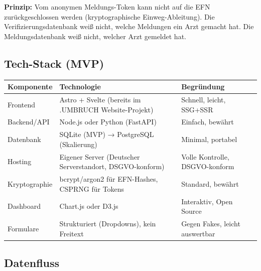 \documentclass{umbruch-position}
\begin{document}
\textbf{Prinzip:} Vom anonymen Meldungs-Token kann nicht auf die EFN zurückgeschlossen werden (kryptographische Einweg-Ableitung). Die Verifizierungsdatenbank weiß nicht, welche Meldungen ein Arzt gemacht hat. Die Meldungsdatenbank weiß nicht, welcher Arzt gemeldet hat.

\subsection{Tech-Stack (MVP)}

{\small
\begin{tabularx}{\textwidth}{X X X}
\toprule
\textbf{Komponente} & \textbf{Technologie} & \textbf{Begründung} \\
\midrule
Frontend & Astro + Svelte (bereits im .UMBRUCH Website-Projekt) & Schnell, leicht, SSG+SSR \\
Backend/API & Node.js oder Python (FastAPI) & Einfach, bewährt \\
Datenbank & SQLite (MVP) → PostgreSQL (Skalierung) & Minimal, portabel \\
Hosting & Eigener Server (Deutscher Serverstandort, DSGVO-konform) & Volle Kontrolle, DSGVO-konform \\
Kryptographie & bcrypt/argon2 für EFN-Hashes, CSPRNG für Tokens & Standard, bewährt \\
Dashboard & Chart.js oder D3.js & Interaktiv, Open Source \\
Formulare & Strukturiert (Dropdowns), kein Freitext & Gegen Fakes, leicht auswertbar \\
\bottomrule
\end{tabularx}
}


\subsection{Datenfluss}
\end{document}
